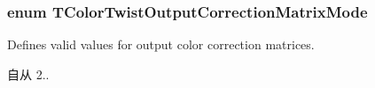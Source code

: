 \hypertarget{group___common_interface_ga0892ed0e7e5949707e49bb7d584f8478}{
\subsubsection[{T\+Color\+Twist\+Output\+Correction\+Matrix\+Mode}]{\setlength{\rightskip}{0pt plus 5cm}enum {\bf T\+Color\+Twist\+Output\+Correction\+Matrix\+Mode}}}\label{group___common_interface_ga0892ed0e7e5949707e49bb7d584f8478}


Defines valid values for output color correction matrices. 

\begin{DoxySince}{自从}
2.. 
\end{DoxySince}
